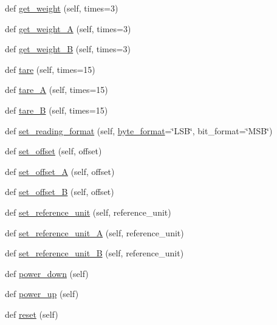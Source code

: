 \begin{DoxyCompactItemize}
\item 
def \hyperlink{classhx711_1_1HX711_aab774e2f3fab77e31be1847716a4de7e}{get\+\_\+weight} (self, times=3)
\item 
def \hyperlink{classhx711_1_1HX711_a78538e468491629a2af993c1278b034c}{get\+\_\+weight\+\_\+A} (self, times=3)
\item 
def \hyperlink{classhx711_1_1HX711_afe8829ad4222d753116df385ffc35807}{get\+\_\+weight\+\_\+B} (self, times=3)
\item 
def \hyperlink{classhx711_1_1HX711_a6939b23087c747bf2519776fe84670b9}{tare} (self, times=15)
\item 
def \hyperlink{classhx711_1_1HX711_a259f1da59370d307d11590f5c849ad65}{tare\+\_\+A} (self, times=15)
\item 
def \hyperlink{classhx711_1_1HX711_a140e5b631075f470254b3565a343387b}{tare\+\_\+B} (self, times=15)
\item 
def \hyperlink{classhx711_1_1HX711_ae125f844075bc5127d18a6c0142b111d}{set\+\_\+reading\+\_\+format} (self, \hyperlink{classhx711_1_1HX711_adbea87f8936ada715b6ae5687c1e7de3}{byte\+\_\+format}=\char`\"{}L\+SB\char`\"{}, bit\+\_\+format=\char`\"{}M\+SB\char`\"{})
\item 
def \hyperlink{classhx711_1_1HX711_a21359f3142d64438b560b91ea0fd69ed}{set\+\_\+offset} (self, offset)
\item 
def \hyperlink{classhx711_1_1HX711_aa43306d5bd7e3fa4ca53f1dc1549d67a}{set\+\_\+offset\+\_\+A} (self, offset)
\item 
def \hyperlink{classhx711_1_1HX711_acc5d6458dfe89691c4640ff0ed0cf2aa}{set\+\_\+offset\+\_\+B} (self, offset)
\item 
def \hyperlink{classhx711_1_1HX711_ae0ed4ca962c1645b92c94fe0a68ef7b5}{set\+\_\+reference\+\_\+unit} (self, reference\+\_\+unit)
\item 
def \hyperlink{classhx711_1_1HX711_a05916ea32c8612b891f7442d8a8d6871}{set\+\_\+reference\+\_\+unit\+\_\+A} (self, reference\+\_\+unit)
\item 
def \hyperlink{classhx711_1_1HX711_a7ff68f12b57a22c1ac2d5be7976862b8}{set\+\_\+reference\+\_\+unit\+\_\+B} (self, reference\+\_\+unit)
\item 
def \hyperlink{classhx711_1_1HX711_ae633dba08439ad21d953e33b7c68b0e6}{power\+\_\+down} (self)
\item 
def \hyperlink{classhx711_1_1HX711_a1902a5b8146ea9080155bf64bc321af9}{power\+\_\+up} (self)
\item 
def \hyperlink{classhx711_1_1HX711_af22b5bf95c6c6763a31abd9f077e8395}{reset} (self)

\end{DoxyCompactItemize}
